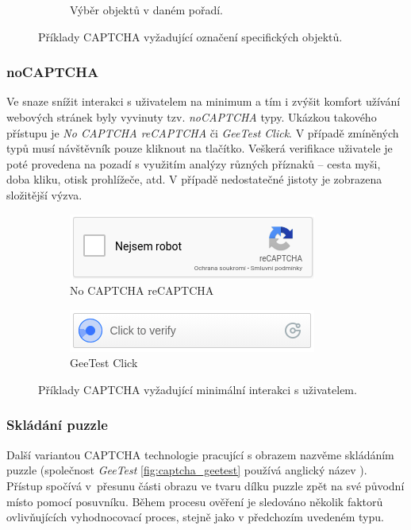 \documentclass[
  field=ainfp,
  master=true,
  biblatex,
  sourcecodes=false,
  theorems=false,
  glossaries,
  index
]{kidiplom}
\begin{document}
\begin{figure}[H]
\begin{subfigure}{.5\textwidth}
  \caption{Výběr objektů v daném pořadí.}  \label{fig:geetest_selection}
\end{subfigure}
\caption{Příklady CAPTCHA vyžadující označení specifických objektů.}
\label{fig:image_selection}
\end{figure}

\subsubsection*{noCAPTCHA}
Ve snaze snížit interakci s uživatelem na minimum a tím i zvýšit komfort užívání webových stránek byly vyvinuty tzv. \textit{noCAPTCHA} typy. 
Ukázkou takového přístupu je \textit{No CAPTCHA reCAPTCHA} či \textit{GeeTest Click}. V případě zmíněných typů musí návštěvník pouze kliknout na tlačítko. Veškerá verifikace uživatele je poté provedena na pozadí s využitím analýzy různých příznaků -- cesta myši, doba kliku, otisk prohlížeče, atd. V případě nedostatečné jistoty je zobrazena složitější výzva.

\begin{figure}[H]
\centering
\begin{subfigure}{.5\textwidth}
  \centering
  \includegraphics[width=.8\linewidth]{images/nocaptcha.png}
  \caption{No CAPTCHA reCAPTCHA}
  \label{fig:sub1}
\end{subfigure}%
\begin{subfigure}{.5\textwidth}
  \centering
  \includegraphics[width=.8\linewidth]{images/geetest_click.png}
  \caption{GeeTest Click}
  \label{fig:sub2}
\end{subfigure}
\caption{Příklady CAPTCHA vyžadující minimální interakci s uživatelem.}
\label{fig:test}
\end{figure}

\subsubsection*{Skládání puzzle}
Další variantou CAPTCHA technologie pracující s obrazem nazvěme skládáním puzzle (společnost \textit{GeeTest} \ref{fig:captcha_geetest} používá anglický název ). Přístup spočívá v~přesunu části obrazu ve tvaru dílku puzzle zpět na své původní místo pomocí posuvníku. Během procesu ověření je sledováno několik faktorů ovlivňujících vyhodnocovací proces, stejně jako v předchozím uvedeném typu.
\end{document}
